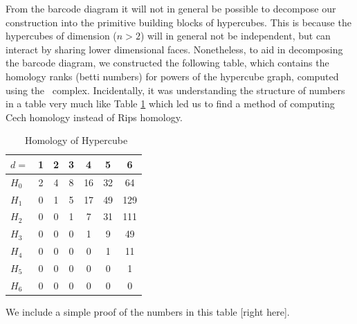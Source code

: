 From the barcode diagram it will not in general be possible to decompose our construction into the primitive building blocks of hypercubes.
This is because the hypercubes of dimension ($n>2$) will in general not be independent, but can interact by sharing lower dimensional faces.
Nonetheless, to aid in decomposing the barcode diagram, we constructed the following table, which contains the homology ranks (betti numbers) for powers of the hypercube graph, computed using the \Cech\ complex.
Incidentally, it was understanding the structure of numbers in a table very much like Table \ref{table:hypercube_homology} which led us to find a method of computing Cech homology instead of Rips homology.

\begin{table}
\centering
\caption{\Cech\ Homology of Hypercube}
\begin{tabular}{lcccccc}
\toprule
$d=$    & 1 & 2 & 3 &  4 &  5 &   6\\
\midrule
$H_{0}$ & 2 & 4 & 8 & 16 & 32 &  64\\
$H_{1}$ & 0 & 1 & 5 & 17 & 49 & 129\\
$H_{2}$ & 0 & 0 & 1 &  7 & 31 & 111\\
$H_{3}$ & 0 & 0 & 0 &  1 &  9 &  49\\
$H_{4}$ & 0 & 0 & 0 &  0 &  1 &  11\\
$H_{5}$ & 0 & 0 & 0 &  0 &  0 &   1\\
$H_{6}$ & 0 & 0 & 0 &  0 &  0 &   0\\
\bottomrule
\end{tabular}
\label{table:hypercube_homology}
\end{table}

We include a simple proof of the numbers in this table [right here].


